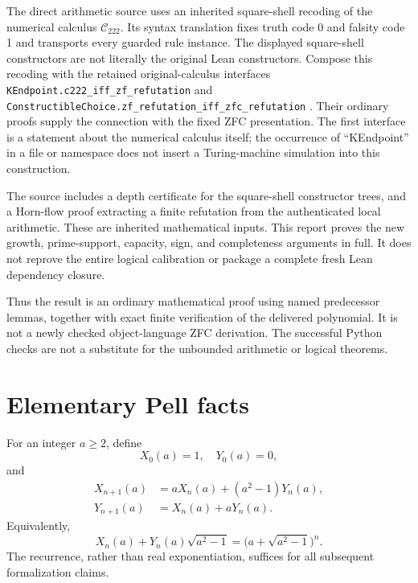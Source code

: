 \documentclass[11pt]{article}
\theoremstyle{definition}
\theoremstyle{remark}
\newcommand{\Ccal}{\mathcal C_{222}}
\begin{document}
The direct arithmetic source uses an inherited square-shell recoding of
the numerical calculus $\Ccal$. Its syntax translation fixes truth code 0
and falsity code 1 and transports every guarded rule instance. The displayed
square-shell constructors are not literally the original Lean constructors.
Compose this recoding with the retained original-calculus interfaces
\nolinkurl{KEndpoint.c222_iff_zf_refutation} and
\nolinkurl{ConstructibleChoice.zf_refutation_iff_zfc_refutation}
\cite{anchor}. Their ordinary proofs supply the connection with the fixed
ZFC presentation. The first interface is a statement about the numerical
calculus itself; the occurrence of ``KEndpoint'' in a file or namespace
does not insert a Turing-machine simulation into this construction.

The source includes a depth certificate for the square-shell constructor
trees, and a Horn-flow proof extracting a finite refutation from the
authenticated local arithmetic. These are inherited mathematical inputs.
This report proves the new growth, prime-support, capacity, sign, and
completeness arguments in full. It does not reprove the entire logical
calibration or package a complete fresh Lean dependency closure.

Thus the result is an ordinary mathematical proof using named predecessor
lemmas, together with exact finite verification of the delivered polynomial.
It is not a newly checked object-language ZFC derivation. The successful
Python checks are not a substitute for the unbounded arithmetic or logical
theorems.

\section{Elementary Pell facts}\label{sec:pellfacts}

For an integer $a\ge2$, define
\[
 X_0(a)=1,\quad Y_0(a)=0,
\]
and
\begin{align*}
 X_{n+1}(a)&=aX_n(a)+(a^2-1)Y_n(a),\\
 Y_{n+1}(a)&=X_n(a)+aY_n(a).
\end{align*}
Equivalently,
\[
 X_n(a)+Y_n(a)\sqrt{a^2-1}
   =\bigl(a+\sqrt{a^2-1}\bigr)^n.
\]
The recurrence, rather than real exponentiation, suffices for all subsequent
formalization claims.
\end{document}
